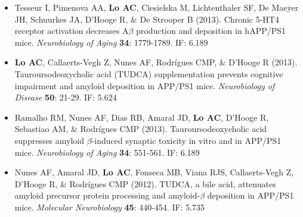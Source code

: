 \documentclass{article}
\begin{document}
\begin{itemize}
    \item Tesseur I, Pimenova AA, \textbf{Lo AC}, Ciesielska M, Lichtenthaler SF, De Maeyer JH, Schuurkes JA, D'Hooge R, \& De Strooper B (2013). Chronic 5-HT4 receptor activation decreases A$\beta$ production and deposition in hAPP/PS1 mice. \emph{Neurobiology of Aging} \textbf{34}: 1779-1789. IF: 6.189
    
    \item \textbf{Lo AC}, Callaerts-Vegh Z, Nunes AF, Rodr\'{i}gues CMP, \& D'Hooge R (2013). Tauroursodeoxycholic acid (TUDCA) supplementation prevents cognitive impairment and amyloid deposition in APP/PS1 mice. \emph{Neurobiology of Disease} \textbf{50}: 21-29. IF: 5.624
    
    \item Ramalho RM, Nunes AF, Dias RB, Amaral JD, \textbf{Lo AC}, D'Hooge R, Sebastiao AM, \& Rodr\'{i}gues CMP (2013). Tauroursodeoxycholic acid suppresses amyloid $\beta$-induced synaptic toxicity in vitro and in APP/PS1 mice. \emph{Neurobiology of Aging} \textbf{34}: 551-561. IF: 6.189
    
    \item Nunes AF, Amaral JD, \textbf{Lo AC}, Fonseca MB, Viana RJS, Callaerts-Vegh Z, D'Hooge R, \& Rodr\'{i}gues CMP (2012). TUDCA, a bile acid, attenuates amyloid precursor protein processing and amyloid-$\beta$ deposition in APP/PS1 mice. \emph{Molecular Neurobiology} \textbf{45}: 440-454. IF: 5.735
\end{itemize}
\end{document}
